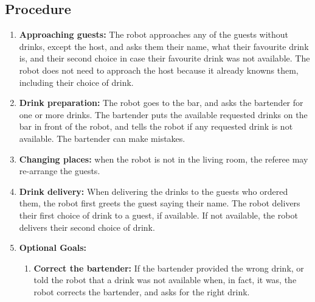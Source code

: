 \subsection*{Procedure}
\begin{enumerate}[nosep]
	\item \textbf{Approaching guests:} The robot approaches any of the guests without drinks, except the host,  and asks them their name, what their favourite drink is, and their second choice in case their favourite drink was not available. The robot does not need to approach the host because it already knowns them, including their choice of drink.
	
	\item \textbf{Drink preparation:} The robot goes to the bar, and asks the bartender for one or more drinks. The bartender puts the available requested drinks on the bar in front of the robot, and tells the robot if any requested drink is not available. The bartender can make mistakes.
	
	\item \textbf{Changing places:} when the robot is not in the living room, the referee may re-arrange the guests.

	
	\item \textbf{Drink delivery:} When delivering the drinks to the guests who ordered them, the robot first greets the guest saying their name. The robot delivers their first choice of drink to a guest, if available. If not available, the robot delivers their second choice of drink. 

	\item \textbf{Optional Goals:}
	\begin{enumerate}
	 \item \textbf{Correct the bartender:} If the bartender provided the wrong drink, or told the robot that a drink was not available when, in fact, it was, the robot corrects the bartender, and asks for the right drink.
	\end{enumerate}

	
\end{enumerate}


